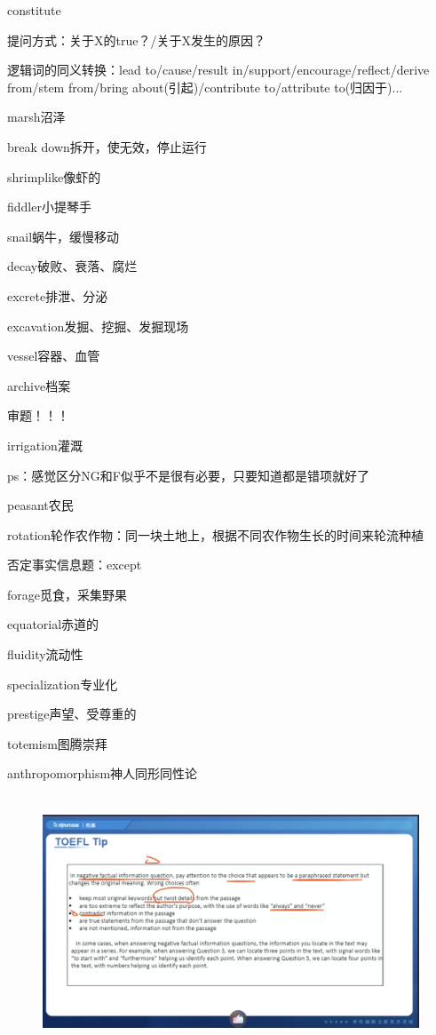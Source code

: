 \documentclass[a4paper, 10pt]{article}
\begin{document}
constitute

提问方式：关于X的true？/关于X发生的原因？

逻辑词的同义转换：lead to/cause/result in/support/encourage/reflect/derive from/stem from/bring about(引起)/contribute to/attribute to(归因于)...

marsh沼泽

break down拆开，使无效，停止运行

shrimplike像虾的

fiddler小提琴手

snail蜗牛，缓慢移动

decay破败、衰落、腐烂

excrete排泄、分泌

excavation发掘、挖掘、发掘现场

vessel容器、血管

archive档案

审题！！！

irrigation灌溉

ps：感觉区分NG和F似乎不是很有必要，只要知道都是错项就好了

peasant农民

rotation轮作农作物：同一块土地上，根据不同农作物生长的时间来轮流种植

否定事实信息题：except

forage觅食，采集野果

equatorial赤道的

fluidity流动性

specialization专业化 

prestige声望、受尊重的

totemism图腾崇拜

anthropomorphism神人同形同性论

\begin{figure}[ht]
    \centering 
    \includegraphics[height=7.5cm,width=14.5cm]{pic7.png}
    
    
    \label{2}
    
\end{figure}
\end{document}
